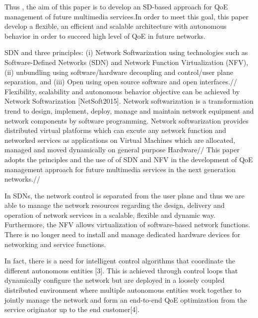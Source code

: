 \documentclass[a4paper]{article}
\begin{document}
Thus , the aim of this paper is to develop an SD-based approach for QoE management of future multimedia services.In order to meet this goal, this paper develop a flexible, an efficient and scalable architecture with autonomous behavior in order to succeed high level of QoE in future networks.

SDN and   three principles: (i) Network Softwarization using technologies such as Software-Defined Networks (SDN) and Network Function Virtualization (NFV), (ii) unbundling using software/hardware decoupling and control/user plane separation, and (iii) Open using open source software and open interfaces.//
Flexibility, scalability and autonomous behavior objective can be achieved by Network Softwarization [NetSoft2015]. Network softwarization is a transformation trend to design, implement, deploy, manage and maintain network equipment and network components by software programming. Network softwarization provides  distributed virtual platforms which can excute any network function and networked services  as applications on Virtual Machines which are allocated, managed and moved dynamically on general purpose Hardware//
This paper adopts the principles and the use of of SDN and NFV in the development of QoE management approach for future multimedia services in the next generation networks.//

In SDNs, the network control is separated from the user plane and thus we are able to manage the network resources regarding the design, delivery and operation of network services in a scalable, flexible and dynamic way. Furthermore, the NFV allows virtualization of software-based network functions. There is no longer need to install and manage dedicated hardware devices for networking and service functions.

In fact, there is a need for intelligent control algorithms that coordinate the different autonomous entities [3]. This is achieved through control loops that dynamically configure the network but are deployed in a loosely coupled distributed environment where multiple autonomous entities work together to jointly manage the network and form an end-to-end QoE optimization from the service originator up to the end customer[4]. \\
\end{document}
